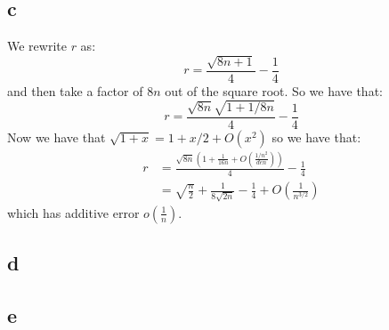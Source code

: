 \documentclass[]{article}
\begin{document}
\subsection{c}
We rewrite $r$ as:
\begin{equation}
	r = \frac{\sqrt{8n + 1}}{4} - \frac{1}{4}
\end{equation}
and then take a factor of $8n$ out of the square root. So we have that:
\begin{equation}
	r = \frac{\sqrt{8n}\sqrt{1+ 1/8n}}{4} - \frac{1}{4}
\end{equation}
Now we have that $\sqrt{1 + x} = 1 + x/2 + O(x^2)$ so we have that:
\begin{align*}
	r &= \frac{\sqrt{8n}\left(1 + \frac{1}{16n} + O(\frac{1/n^2}{den})\right)}{4} - \frac{1}{4}\\
	&= \sqrt{\frac{n}{2}} + \frac{1}{8 \sqrt{2 n}} - \frac{1}{4} + O(\frac{1}{n^{3/2}})
\end{align*}
which has additive error $o(\frac{1}{n})$. 

\subsection{d}

\subsection{e}
\end{document}
